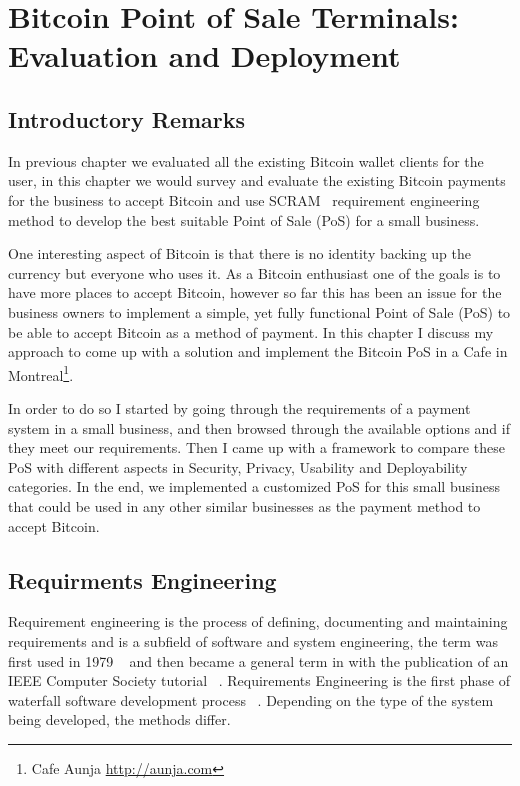 
\chapter{Bitcoin Point of Sale Terminals: Evaluation and Deployment}


\section{Introductory Remarks}

In previous chapter we evaluated all the existing Bitcoin wallet clients for the user, in this chapter we would survey and evaluate the existing Bitcoin payments for the business to accept Bitcoin and use SCRAM~\cite{REScenario}  requirement engineering method to develop the best suitable Point of Sale (PoS) for a small business.

One interesting aspect of Bitcoin is that there is no identity backing up the currency but everyone who uses it. As a Bitcoin enthusiast one of the goals is to have more places to accept Bitcoin, however so far this has been an issue for the business owners to implement a simple, yet fully functional Point of Sale (PoS) to be able to accept Bitcoin as a method of payment.
In this chapter I discuss my approach to come up with a solution and implement the Bitcoin PoS in a Cafe in Montreal\footnote{ Cafe Aunja \url{http://aunja.com}}.

In order to do so I started by going through the requirements of a payment system in a small business, and then browsed through the available options and if they meet our requirements. Then I came up with a framework to compare these PoS with different aspects in Security, Privacy, Usability and Deployability categories. In the end, we implemented a customized PoS for this small business that could be used in any other similar businesses as the payment method to accept Bitcoin.

\section {Requirments Engineering}
Requirement engineering is the process of defining, documenting and maintaining requirements and is a subfield of software and system engineering, the term was first used in 1979 ~\cite{alford1979software} and then became a general term in with the publication of an IEEE Computer Society tutorial ~\cite{dorfman1990system}.
Requirements Engineering is the first phase of waterfall software development process ~\cite{rocye1970managing}. Depending on the type of the system being developed, the methods differ.

